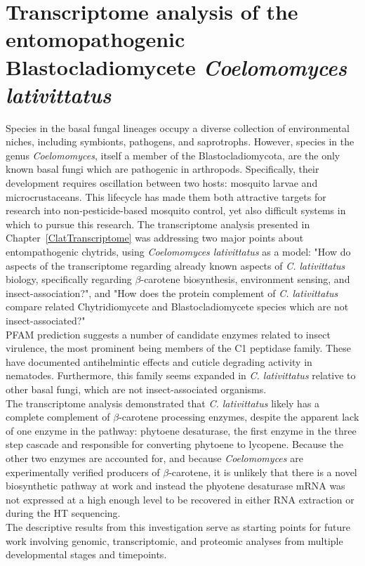 \section{Transcriptome analysis of the entomopathogenic Blastocladiomycete \textit{Coelomomyces lativittatus}}
Species in the basal fungal lineages occupy a diverse collection of environmental niches, including symbionts, pathogens, and saprotrophs. However, species in the genus \textit{Coelomomyces}, itself a member of the Blastocladiomycota, are the only known basal fungi which are pathogenic in arthropods. Specifically, their development requires oscillation between two hosts: mosquito larvae and microcrustaceans. This lifecycle has made them both attractive targets for research into non-pesticide-based mosquito control, yet also difficult systems in which to pursue this research. The transcriptome analysis presented in Chapter~\ref{ClatTranscriptome} was addressing two major points about entompathogenic chytrids, using \textit{Coelomomyces lativittatus} as a model: "How do aspects of the transcriptome regarding already known aspects of \textit{C. lativittatus} biology, specifically regarding $\beta$-carotene biosynthesis, environment sensing, and insect-association?", and "How does the protein complement of \textit{C. lativittatus} compare related Chytridiomycete and Blastocladiomycete species which are not insect-associated?"\\
\indent PFAM prediction suggests a number of candidate enzymes related to insect virulence, the most prominent being members of the C1 peptidase family. These have documented antihelmintic effects and cuticle degrading activity in nematodes. Furthermore, this family seems expanded in \textit{C. lativittatus} relative to other basal fungi, which are not insect-associated organisms.\\
\indent The transcriptome analysis demonstrated that \textit{C. lativittatus} likely has a complete complement of $\beta$-carotene processing enzymes, despite the apparent lack of one enzyme in the pathway: phytoene desaturase, the first enzyme in the three step cascade and responsible for converting phytoene to lycopene. Because the other two enzymes are accounted for, and because \textit{Coelomomyces} are experimentally verified producers of $\beta$-carotene, it is unlikely that there is a novel biosynthetic pathway at work and instead the phyotene desaturase mRNA was not expressed at a high enough level to be recovered in either RNA extraction or during the HT sequencing.\\ 
\indent The descriptive results from this investigation serve as starting points for future work involving genomic, transcriptomic, and proteomic analyses from multiple developmental stages and timepoints.\\
